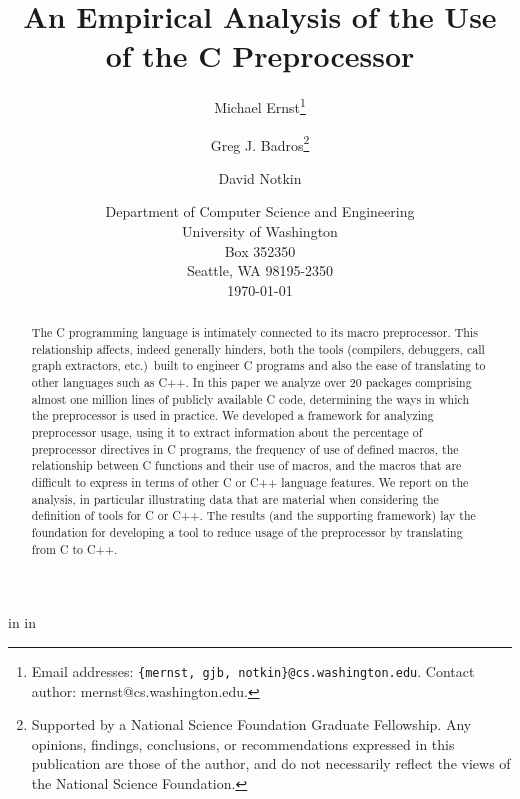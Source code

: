 
\marginparwidth 0pt
\oddsidemargin  0pt
\evensidemargin 0pt
\marginparsep 0pt

\topmargin   0pt

 in
 in




\title{An Empirical Analysis of the Use of the C Preprocessor}

\author{Michael Ernst\thanks{Email 
addresses: {\tt \{mernst, gjb, notkin\}@cs.washington.edu}.  Contact author:
mernst@cs.washington.edu.}
\and Greg J. Badros\thanks{Supported by a National Science Foundation
    Graduate Fellowship. Any opinions, findings, conclusions, or
    recommendations expressed in this publication are those of the
    author, and do not necessarily reflect the views of the National
    Science Foundation.} \and David Notkin}

\date{Department of Computer
Science and Engineering\\
University of Washington\\
Box 352350\\
Seattle, WA  98195-2350\\
\today}  

\maketitle


\begin{abstract}

  The C programming language is intimately connected to its macro
  preprocessor.  This relationship affects, indeed generally hinders, both
  the tools (compilers, debuggers, call graph extractors, etc.)\ built to
  engineer C programs and also the ease of translating to other languages
  such as C++.  In this paper we analyze over 20 packages comprising almost
  one million lines of publicly available C code, determining the ways in
  which the preprocessor is used in practice.  We developed a framework for
  analyzing preprocessor usage, using it to extract information about the
  percentage of preprocessor directives in C programs, the frequency of use
  of defined macros, the relationship between C functions and their use of
  macros, and the macros that are difficult to express in terms of other C
  or C++ language features.  We report on the analysis, in particular
  illustrating data that are material when considering the definition of
  tools for C or C++.  The results (and the supporting framework) lay the
  foundation for developing a tool to reduce usage of the preprocessor by
  translating from C to C++.

\end{abstract}

